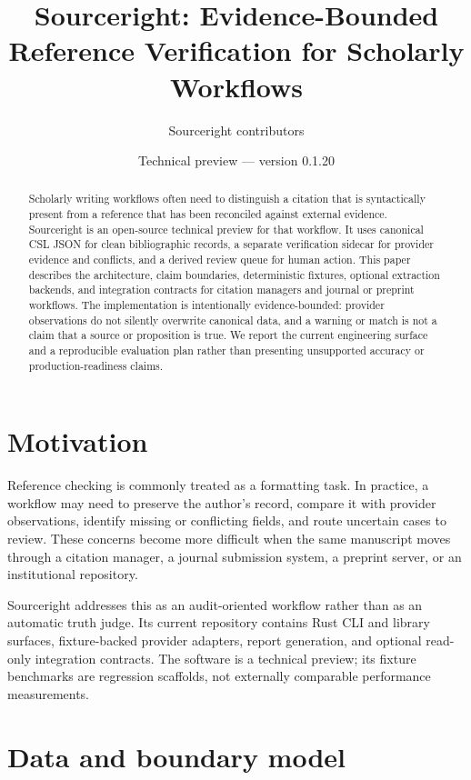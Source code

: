 \documentclass[11pt]{article}
\title{Sourceright: Evidence-Bounded Reference Verification for Scholarly Workflows}
\author{Sourceright contributors}
\date{Technical preview --- version 0.1.20}
\begin{document}
\maketitle

\begin{abstract}
Scholarly writing workflows often need to distinguish a citation that is
syntactically present from a reference that has been reconciled against
external evidence. Sourceright is an open-source technical preview for that
workflow. It uses canonical CSL JSON for clean bibliographic records, a
separate verification sidecar for provider evidence and conflicts, and a
derived review queue for human action. This paper describes the architecture,
claim boundaries, deterministic fixtures, optional extraction backends, and
integration contracts for citation managers and journal or preprint workflows.
The implementation is intentionally evidence-bounded: provider observations
do not silently overwrite canonical data, and a warning or match is not a
claim that a source or proposition is true. We report the current engineering
surface and a reproducible evaluation plan rather than presenting unsupported
accuracy or production-readiness claims.
\end{abstract}

\section{Motivation}

Reference checking is commonly treated as a formatting task. In practice, a
workflow may need to preserve the author's record, compare it with provider
observations, identify missing or conflicting fields, and route uncertain cases
to review. These concerns become more difficult when the same manuscript moves
through a citation manager, a journal submission system, a preprint server, or
an institutional repository.

Sourceright addresses this as an audit-oriented workflow rather than as an
automatic truth judge. Its current repository contains Rust CLI and library
surfaces, fixture-backed provider adapters, report generation, and optional
read-only integration contracts. The software is a technical preview; its
fixture benchmarks are regression scaffolds, not externally comparable
performance measurements.

\section{Data and boundary model}
\end{document}
